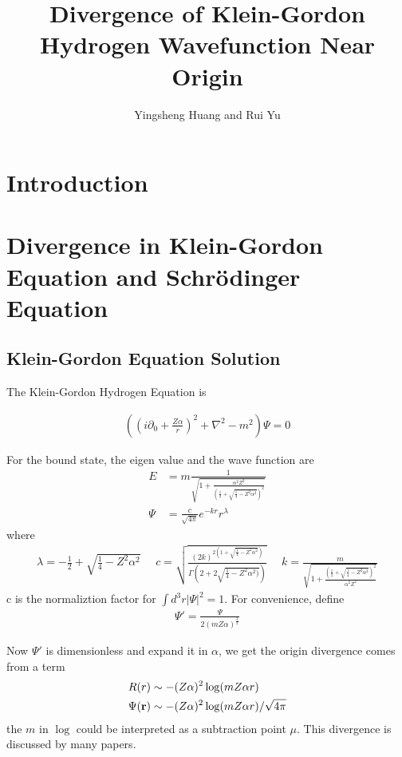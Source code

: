 \documentclass{article}
\title{Divergence of Klein-Gordon Hydrogen Wavefunction Near Origin}
\author{Yingsheng Huang and Rui Yu}
\renewcommand{\a}{\alpha}
\begin{document}
\maketitle
\section*{Introduction}



\section{Divergence in Klein-Gordon Equation and Schr\"odinger Equation}
\subsection{Klein-Gordon Equation Solution}
The Klein-Gordon Hydrogen Equation is

\begin{align}
	((i\partial_0+\frac{Z\alpha}{r})^2+\nabla^2-m^2)\Psi=0
\end{align}

For the bound state, the eigen value and the wave function are\cite{Greiner2000}
\begin{align}
	E    & =m\frac{1}{\sqrt{1+\frac{\alpha^2 Z^2}{(\frac{1}{2}+\sqrt{\frac{1}{4}-Z^2\alpha^2})^2}}} \\
	\Psi & =\frac{c}{\sqrt{4\pi}}e^{-kr}r^\lambda
\end{align}
where
\begin{align}
	\lambda=-\frac{1}{2}+\sqrt{\frac{1}{4}-Z^2\alpha^2}\ \ \ \ \ \
	c=\sqrt{\frac{(2k)^{2(1+\sqrt{\frac{1}{4}-Z^2\alpha^2})}}{\Gamma(2+2\sqrt{\frac{1}{4}-Z^2\alpha^2)})}}\ \ \ \ \ \
	k=\frac{m}{\sqrt{1+\frac{(\frac{1}{2}+\sqrt{\frac{1}{4}-Z^2\alpha^2})^2}{\alpha^2Z^2}}}
\end{align}
c is the normaliztion factor for $\int d^3r|\Psi|^2=1$. For convenience, define
\begin{align}
	\Psi '=\frac{\Psi}{2(mZ\alpha)^\frac{3}{2}}
\end{align}

Now $\Psi '$ is dimensionless and expand it in $\alpha$, we get the origin divergence comes from a term
\begin{align}
	R(r)&\sim-(Z\alpha)^2\log(m Z \a r)\\
	\Psi(\vb{r})&\sim-(Z\alpha)^2\log(m Z \a r)/\sqrt{4\pi}
\end{align}
the $m$ in $\log$ could be interpreted as a subtraction point $\mu$. This divergence is discussed by many papers\cite{Chen2007,Chen2009}.
\end{document}
